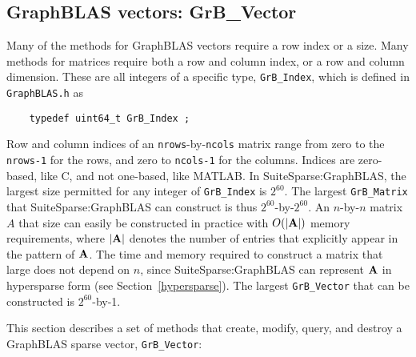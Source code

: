 \documentclass[12pt]{article}
\begin{document}
\newpage
\subsection{GraphBLAS vectors: {\sf GrB\_Vector}} %
\label{vector}

Many of the methods for GraphBLAS vectors require a row index or a size.  Many
methods for matrices require both a row and column index, or a row and column
dimension.  These are all integers of a specific type, \verb'GrB_Index',
which is defined in \verb'GraphBLAS.h' as

    {\footnotesize
    \begin{verbatim}
    typedef uint64_t GrB_Index ; \end{verbatim}}

Row and column indices of an \verb'nrows'-by-\verb'ncols' matrix range from
zero to the \verb'nrows-1' for the rows, and zero to \verb'ncols-1' for the
columns.  Indices are zero-based, like C, and not one-based, like MATLAB.  In
SuiteSparse:GraphBLAS, the largest size permitted for any integer of
\verb'GrB_Index' is $2^{60}$.  The largest \verb'GrB_Matrix' that
SuiteSparse:GraphBLAS can construct is thus $2^{60}$-by-$2^{60}$.  An
$n$-by-$n$ matrix $A$ that size can easily be constructed in practice with
$O(|{\bf A}|)$ memory requirements, where $|{\bf A}|$ denotes the number of
entries that explicitly appear in the pattern of ${\bf A}$.  The time and
memory required to construct a matrix that large does not depend on $n$, since
SuiteSparse:GraphBLAS can represent ${\bf A}$ in hypersparse form (see
Section~\ref{hypersparse}).  The largest \verb'GrB_Vector' that can be
constructed is $2^{60}$-by-1.

This section describes a set of methods that create, modify, query,
and destroy a GraphBLAS sparse vector, \verb'GrB_Vector':
\end{document}

